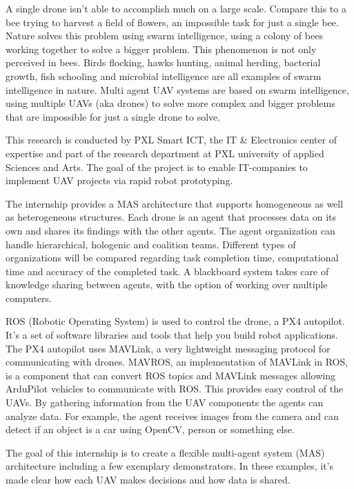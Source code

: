 \begin{addmargin}[5ex]{0pt}
  
A single drone isn’t able to accomplish much on a large scale. Compare this to a bee trying to harvest a field of flowers, an impossible task for just a single bee. Nature solves this problem using swarm intelligence, using a colony of bees working together to solve a bigger problem. This phenomenon is not only perceived in bees. Birds flocking, hawks hunting, animal herding, bacterial growth, fish schooling and microbial intelligence are all examples of swarm intelligence in nature. Multi agent UAV systems are based on swarm intelligence, using multiple UAVs (aka drones) to solve more complex and bigger problems that are impossible for just a single drone to solve.

This research is conducted by PXL Smart ICT, the IT & Electronics center of expertise and part of the research department at PXL university of applied Sciences and Arts. The goal of the project is to enable IT-companies to implement UAV projects via rapid robot prototyping.

The internship provides a MAS architecture that supports homogeneous as well as heterogeneous structures. Each drone is an agent that processes data on its own and shares its findings with the other agents. The agent organization can handle hierarchical, hologenic and coalition teams. Different types of organizations will be compared regarding task completion time, computational time and accuracy of the completed task. A blackboard system takes care of knowledge sharing between agents, with the option of working over multiple computers. 

ROS (Robotic Operating System) is used to control the drone, a PX4 autopilot. It’s a set of software libraries and tools that help you build robot applications. The PX4 autopilot uses MAVLink, a very lightweight messaging protocol for communicating with drones. MAVROS, an implementation of MAVLink in ROS, is a component that can convert ROS topics and MAVLink messages allowing ArduPilot vehicles to communicate with ROS. This provides easy control of the UAVs. By gathering information from the UAV components the agents can analyze data. For example, the agent receives images from the camera and can detect if an object is a car using OpenCV, person or something else.

The goal of this internship is to create a flexible multi-agent system (MAS) architecture including a few exemplary demonstrators. In these examples, it’s made clear how each UAV makes decisions and how data is shared.

\end{addmargin}